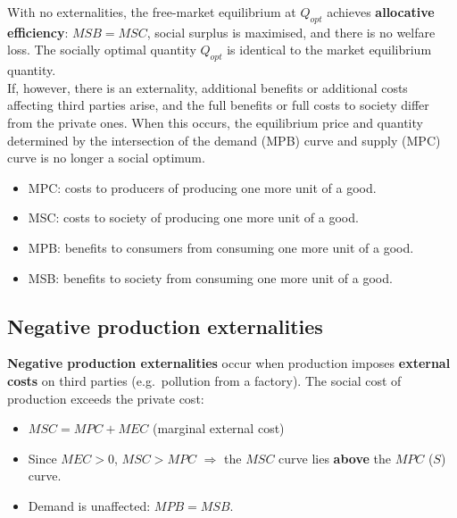 \begin{center}
\end{center}
With no externalities, the free-market equilibrium at $Q_{opt}$ achieves \textbf{allocative efficiency}: $MSB = MSC$, social surplus is maximised, and there is no welfare loss. The socially optimal quantity $Q_{opt}$ is identical to the market equilibrium quantity.
\\If, however, there is an externality, additional benefits 
or additional costs affecting third parties arise, and the full benefits or full costs to society differ from the private ones. When this occurs, the equilibrium price and quantity determined by the intersection of the demand (MPB) curve and supply (MPC) curve is no longer a social optimum.
\begin{itemize}
  \item MPC: costs to producers of producing one more unit of a good.
  \item MSC: costs to society of producing one more unit of a good.
  \item MPB: benefits to consumers from consuming one more unit of a good.
  \item MSB: benefits to society from consuming one more unit of a good.
\end{itemize}
\subsection{Negative production externalities}
\textbf{Negative production externalities} occur when production imposes \textbf{external costs} on third parties (e.g.\ pollution from a factory). The social cost of production exceeds the private cost:
\begin{itemize}
  \item $MSC = MPC + MEC$ (marginal external cost)
  \item Since $MEC > 0$, $MSC > MPC$ $\Rightarrow$ the $MSC$ curve lies \textbf{above} the $MPC$ ($S$) curve.
  \item Demand is unaffected: $MPB = MSB$.
\end{itemize}


